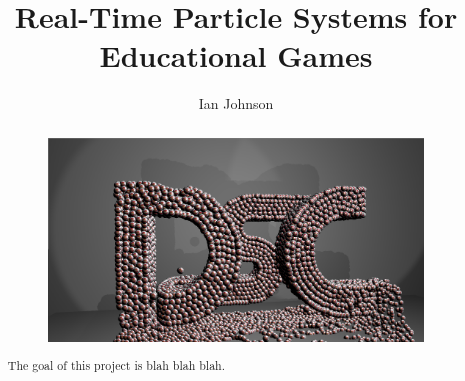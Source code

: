 \documentclass[11pt]{fsuthesis}
\title{Real-Time Particle Systems for Educational Games}
\author{Ian Johnson}
\begin{document}
\frontmatter
\maketitle
\makesignaturepage



\tableofcontents
\listoffigures



\begin{abstract}
\begin{figure}[!htc]
 		\centering
		\includegraphics[scale=0.25]{figures/dsc_fsuseal.png}
		\label{fig:dsc_fsuseal}
\end{figure}

The goal of this project is blah blah blah.


\end{abstract}

\mainmatter










\pagebreak

\appendix


\end{document}
